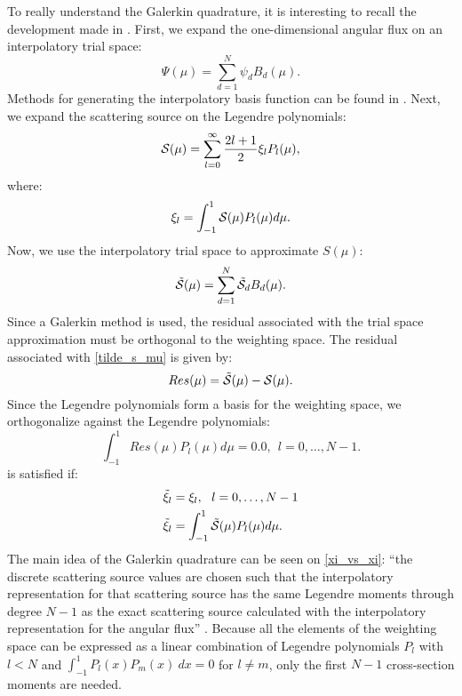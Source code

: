 To really understand the Galerkin quadrature, it is interesting to recall 
the development made in \cite{galerkin_morel}. First, we expand the
one-dimensional angular flux on an interpolatory trial space:
\begin{equation}
\Psi(\mu) = \sum_{d=1}^N \psi_d B_d(\mu).
\label{psi_b}
\end{equation}
Methods for generating the interpolatory basis function can be found in 
\cite{galerkin_morel}. Next, we expand the scattering source on the Legendre
polynomials:
\begin{equation}
\mc{S}(\mu) = \sum_{l=0}^{\infty} \frac{2l+1}{2} \xi_l P_l(\mu),
\label{S_mu_2}
\end{equation}
where:
\begin{equation}
  \xi_l = \int_{-1}^1 \mathcal{S}(\mu) P_l(\mu) d\mu.
\end{equation}
Now, we use the interpolatory trial space to approximate $S(\mu)$:
\begin{equation}
\tilde{\mc{S}}(\mu) = \sum_{d=1}^N \tilde{\mc{S}}_d B_d(\mu).
\label{tilde_s_mu}
\end{equation}
Since a Galerkin method is used, the residual associated with the trial space 
approximation must be orthogonal to the weighting
space. The residual associated with \cref{tilde_s_mu} is given by:
\begin{equation}
Res(\mu) = \tilde{\mc{S}}(\mu) - \mc{S}(\mu).
\label{R_mu}
\end{equation}
Since the Legendre polynomials form a basis for the weighting space, we
orthogonalize against the Legendre polynomials:
\begin{equation}
\int_{-1}^1 Res(\mu) P_l(\mu) d\mu = 0.0,\ \ l=0,\hdots,N-1.
\label{int_r_mu}
\end{equation}
 is satisfied if:
\begin{align}
&\tilde{\xi}_l = \xi_l,\ \ l=0,\hdots,N-1 \label{xi_vs_xi}\\
&\tilde{\xi}_l = \int_{-1}^1 \tilde{\mc{S}}(\mu) P_l(\mu) d\mu.
\end{align}
The main idea of the Galerkin quadrature can be seen on \cref{xi_vs_xi}: ``the
discrete scattering source values are chosen such that the interpolatory
representation for that scattering source has the same Legendre moments
through degree $N-1$ as the exact scattering source calculated with the
interpolatory representation for the angular flux'' \cite{galerkin_morel}. 
Because all the elements of the weighting space can be expressed as a linear
combination of Legendre polynomials $P_l$ with $l<N$ and $\int_{-1}^{1}
P_l(x)P_m(x)\ dx=0$ for $l\neq m$, only the first $N-1$ cross-section moments
are needed.

